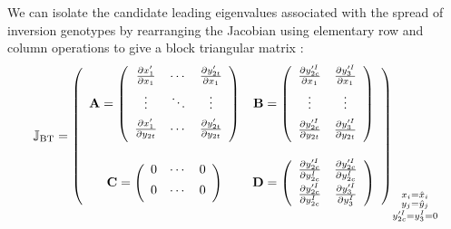 \documentclass{article}
\begin{document}
\begin{appendices}
\noindent We can isolate the candidate leading eigenvalues associated with the spread of inversion genotypes by rearranging the Jacobian using elementary row and column operations to give a block triangular matrix \cite[Supplement~to~Primer~2]{OttoDay2007}:
\begin{equation}
	\mathbb{J}_{\text{BT}} = \left( \begin{array}{cc}
		\mathbf{A} = \left( \begin{array}{ccc} 
										\frac{\partial x'_1}{\partial x_1} & \cdots & \frac{\partial y'_{2t}}{\partial x_1} \\[1ex]
										\vdots & \ddots & \vdots \\[1ex]
										\frac{\partial x'_1}{\partial y_{2t}} & \cdots & \frac{\partial y'_{2t}}{\partial y_{2t}} \\[1ex]
									\end{array} \right) &
				\mathbf{B} = \left( \begin{array}{cc} 
										\frac{\partial y'^I_{2c}}{\partial x_1} & \frac{\partial y'^I_{3}}{\partial x_1} \\[1ex]
										\vdots & \vdots \\[1ex]
										\frac{\partial y'^I_{2c}}{\partial y_{2t}} & \frac{\partial y'^I_{3}}{\partial y_{2t}} \\[1ex]
									\end{array} \right) \\
		\!\rule{0pt}{0pt} \\
		\mathbf{C} = \left( \begin{array}{ccc} 
								0 & \cdots & 0\\[1ex]
								0 & \cdots & 0\\[1ex]
							\end{array} \right) &
		\mathbf{D} = \left( \begin{array}{cc} 
								\frac{\partial y'^I_{2c}}{\partial y^I_{2c}} & \frac{\partial y'^I_{2c}}{\partial y^I_{2c}} \\[1ex]
								\frac{\partial y'^I_{2c}}{\partial y^I_{2c}} & \frac{\partial y'^I_{3}}{\partial y^I_{3}} \\[1ex]
							\end{array} \right) \\[1ex]
				 \end{array} \right)_{\substack{
										x_i = \hat{x}_i \\
										y_j = \hat{y}_j \\
										y'^I_{2c} = y^I_{3} = 0}} \\[1ex]
\end{equation}


\end{appendices}
\end{document}
